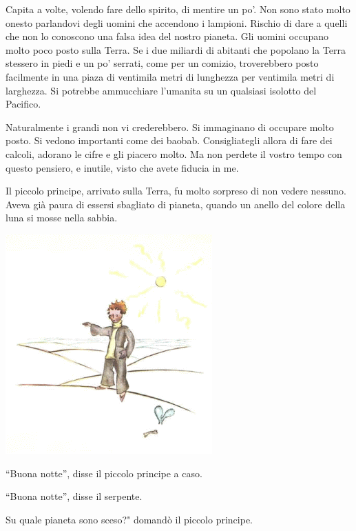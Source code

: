 \documentclass[11pt]{scrbook}
\begin{document}
Capita a volte, volendo fare dello spirito, di mentire un po'. Non sono
stato molto onesto parlandovi degli uomini che accendono i lampioni.
Rischio di dare a quelli che non lo conoscono una falsa idea del nostro
pianeta. Gli uomini occupano molto poco posto sulla Terra. Se i due
miliardi di abitanti che popolano la Terra stessero in piedi e un po'
serrati, come per un comizio, troverebbero posto facilmente in una piaza
di ventimila metri di lunghezza per ventimila metri di larghezza. Si
potrebbe ammucchiare l'umanita su un qualsiasi isolotto del Pacifico.

Naturalmente i grandi non vi crederebbero. Si immaginano di occupare
molto posto. Si vedono importanti come dei baobab. Consigliategli allora
di fare dei calcoli, adorano le cifre e gli piacero molto. Ma non
perdete il vostro tempo con questo pensiero, e inutile, visto che avete
fiducia in me.

Il piccolo principe, arrivato sulla Terra, fu molto sorpreso di non
vedere nessuno. Aveva già paura di essersi sbagliato di pianeta, quando
un anello del colore della luna si mosse nella sabbia.

\begin{center}
\includegraphics{./img/naZemi.png}
\end{center}

``Buona notte'', disse il piccolo principe a caso.

``Buona notte'', disse il serpente.

Su quale pianeta sono sceso?" domandò il piccolo principe.
\end{document}
